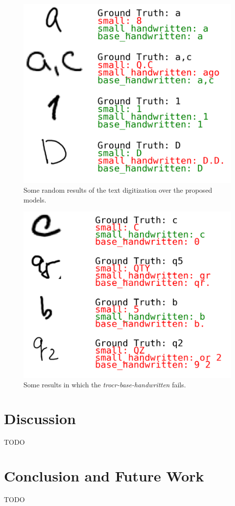 \documentclass[conference]{IEEEtran}
\begin{document}
\begin{figure}[H]
\centering
\includegraphics[width=\linewidth]{text_digitization_results_1.png}
\caption{Some random results of the text digitization over the proposed models.}
\label{fig:text_digitization_results_1}
\end{figure}

\begin{figure}[H]
\centering
\includegraphics[width=\linewidth]{text_digitization_results_2.png}
\caption{Some results in which the \textit{trocr-base-handwritten} fails.}
\label{fig:text_digitization_results_2}
\end{figure}

\section{Discussion}
TODO

\section{Conclusion and Future Work}
TODO



\end{document}
